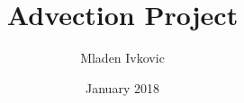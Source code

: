 




\title{Advection Project}


\author[M. Ivkovic]{Mladen Ivkovic}
\date{January 2018} 










% 
% 
% 
% 
% 








